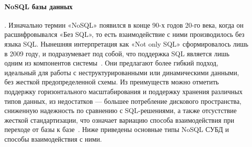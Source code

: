 \paragraph{NoSQL базы данных}. Изначально термин «NoSQL» появился в конце 90-х годов 20-го века,
когда он расшифровывался «Без SQL», то есть взаимодействие с ними производилось без языка SQL.
Нынешняя интерпретация как «Not only SQL» сформировалось лишь в 2009 году, и  подразумевает под собой,
что поддержка SQL является лишь одним из  компонентов системы~\cite{savoskinIssledovanieSposobovPrimeneniya2019,
      smallcombeSQLVsNoSQL}. Они предлагают более гибкий подход, идеальный для работы с неструктурированными или
динамическими данными, без жесткой предопределенной схемы.
Из преимуществ можно отметить поддержку горизонтального масштабирования и поддержку хранения различных типов данных,
из недостатков --- большее потребление дискового пространства, сниженную надежность по сравнению с SQL-решениями, а также
отсустствие жесткой стандартизации, что означает вариацию способа взаимодействия при переходе от базы к
базе~\cite{savoskinIssledovanieSposobovPrimeneniya2019, koryaginModeliBazDannyh2020,smallcombeSQLVsNoSQL,
      kleymenovNoSQLRelyacionnyeBazy2022, savoskinIssledovanieSposobovPrimeneniya2019}.
Ниже приведены основные типы NoSQL СУБД и способы взаимодействия с ними.
